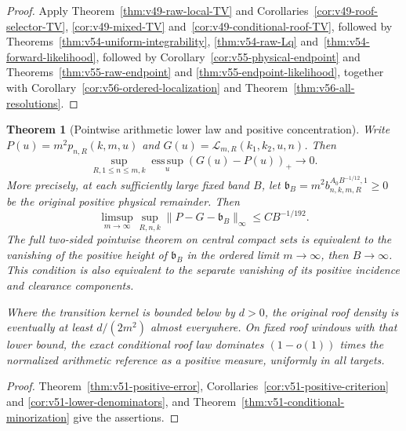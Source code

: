 \documentclass[11pt,reqno]{amsart}
\numberwithin{equation}{section}
\newtheorem{leadtheorem}{Theorem}
\theoremstyle{definition}\newtheorem{definition}[theorem]{Definition}
\theoremstyle{remark}\newtheorem{remark}[theorem]{Remark}
\begin{document}
\begin{proof}
Apply Theorem~\ref{thm:v49-raw-local-TV} and
Corollaries~\ref{cor:v49-roof-selector-TV}, \ref{cor:v49-mixed-TV}
and~\ref{cor:v49-conditional-roof-TV}, followed by
Theorems~\ref{thm:v54-uniform-integrability}, \ref{thm:v54-raw-Lq}
and~\ref{thm:v54-forward-likelihood}, followed by
Corollary~\ref{cor:v55-physical-endpoint} and
Theorems~\ref{thm:v55-raw-endpoint} and
\ref{thm:v55-endpoint-likelihood}, together with Corollary~\ref{cor:v56-ordered-localization} and Theorem~\ref{thm:v56-all-resolutions}.
\end{proof}


\begin{leadtheorem}[Pointwise arithmetic lower law and positive concentration]
\label{thm:intro-v51-lower}
Write $P(u)=m^2p_{n,R}(k,m,u)$ and
$G(u)=\mathcal L_{m,R}(k_1,k_2,u,n)$. Then
\[
 \sup_{R,1\le n\le m,k}\operatorname*{ess\,sup}_u(G(u)-P(u))_+
                                                       \longrightarrow0.
\]
More precisely, at each sufficiently large fixed band $B$, let
$\mathfrak b_B=m^2b^{A_0B^{-1/12},1}_{n,k,m,R}\ge0$ be the
original positive physical remainder. Then
\[
 \limsup_{m\to\infty}\sup_{R,n,k}
                  \|P-G-\mathfrak b_B\|_\infty\le CB^{-1/192}.
\]
The full two-sided pointwise theorem on central compact sets is
equivalent to the vanishing of the positive height of $\mathfrak b_B$
in the ordered limit $m\to\infty$, then $B\to\infty$.
This condition is also equivalent to the separate vanishing of its
positive incidence and clearance components.

Where the transition kernel is bounded below by $d>0$, the original
roof density is eventually at least $d/(2m^2)$ almost everywhere.
On fixed roof windows with that lower bound, the exact conditional
roof law dominates $(1-o(1))$ times the normalized arithmetic reference
as a positive measure, uniformly in all targets.
\end{leadtheorem}
\begin{proof}
Theorem~\ref{thm:v51-positive-error},
Corollaries~\ref{cor:v51-positive-criterion} and
\ref{cor:v51-lower-denominators}, and
Theorem~\ref{thm:v51-conditional-minorization} give the assertions.
\end{proof}
\end{document}
